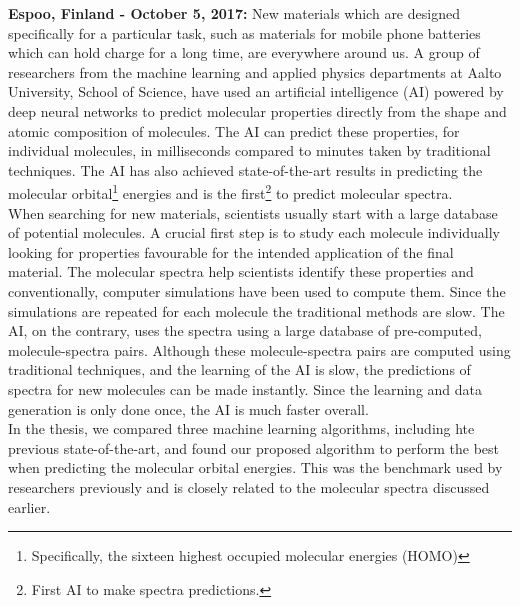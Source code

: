 \documentclass[a4paper]{article}
\title{\justify\fontsize{20}{20}\selectfont{AI developed by a group of researchers at Aalto University could significantly speed up the search for new materials.}}
\begin{document}
\date{}
\maketitle
%     

\noindent \textbf{Espoo, Finland - October 5, 2017:} New materials which are designed specifically for a particular task, such as materials for mobile phone batteries which can hold charge for a long time, are everywhere around us. A group of researchers from the machine learning and applied physics departments at Aalto University, School of Science, have used an artificial intelligence (AI) powered by deep neural networks to predict molecular properties directly from the shape and atomic composition of molecules. The AI can predict these properties, for individual molecules, in milliseconds compared to minutes taken by traditional techniques. The AI has also achieved state-of-the-art results in predicting the molecular orbital\footnote{Specifically, the sixteen highest occupied molecular energies (HOMO)} energies and is the first\footnote{First AI to make spectra predictions.} to predict molecular spectra.\\

When searching for new materials, scientists usually start with a large database of potential molecules. A crucial first step is to study each molecule individually looking for properties favourable for the intended application of the final material. The molecular spectra help scientists identify these properties and conventionally, computer simulations have been used to compute them. Since the simulations are repeated for each molecule the traditional methods are slow. The AI, on the contrary, uses the spectra using a large database of pre-computed, molecule-spectra pairs. Although these molecule-spectra pairs are computed using traditional techniques, and the learning of the AI is slow, the predictions of spectra for new molecules can be made instantly. Since the learning and data generation is only done once, the AI is much faster overall.\\

In the thesis, we compared three machine learning algorithms, including hte previous state-of-the-art, and found our proposed algorithm to perform the best when predicting the molecular orbital energies. This was the benchmark used by researchers previously and is closely related to the molecular spectra discussed earlier.\\
\end{document}
